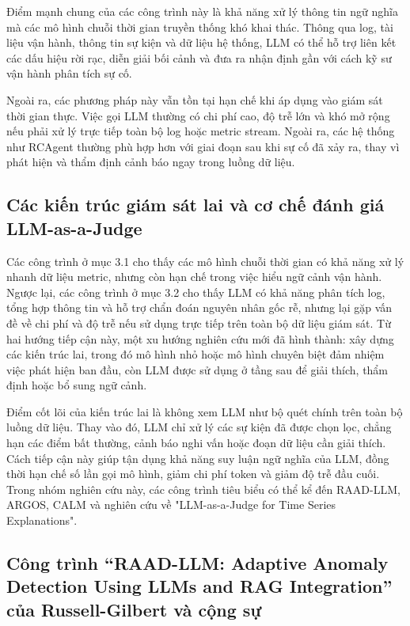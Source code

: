 Điểm mạnh chung của các công trình này là khả năng xử lý thông tin ngữ nghĩa mà các mô hình chuỗi thời gian truyền thống khó khai thác. Thông qua log, tài liệu vận hành, thông tin sự kiện và dữ liệu hệ thống, LLM có thể hỗ trợ liên kết các dấu hiệu rời rạc, diễn giải bối cảnh và đưa ra nhận định gần với cách kỹ sư vận hành phân tích sự cố.

Ngoài ra, các phương pháp này vẫn tồn tại hạn chế khi áp dụng vào giám sát thời gian thực. Việc gọi LLM thường có chi phí cao, độ trễ lớn và khó mở rộng nếu phải xử lý trực tiếp toàn bộ log hoặc metric stream. Ngoài ra, các hệ thống như RCAgent thường phù hợp hơn với giai đoạn sau khi sự cố đã xảy ra, thay vì phát hiện và thẩm định cảnh báo ngay trong luồng dữ liệu.

\subsection{Các kiến trúc giám sát lai và cơ chế đánh giá LLM-as-a-Judge}
Các công trình ở mục 3.1 cho thấy các mô hình chuỗi thời gian có khả năng xử lý nhanh dữ liệu metric, nhưng còn hạn chế trong việc hiểu ngữ cảnh vận hành. Ngược lại, các công trình ở mục 3.2 cho thấy LLM có khả năng phân tích log, tổng hợp thông tin và hỗ trợ chẩn đoán nguyên nhân gốc rễ, nhưng lại gặp vấn đề về chi phí và độ trễ nếu sử dụng trực tiếp trên toàn bộ dữ liệu giám sát. Từ hai hướng tiếp cận này, một xu hướng nghiên cứu mới đã hình thành: xây dựng các kiến trúc lai, trong đó mô hình nhỏ hoặc mô hình chuyên biệt đảm nhiệm việc phát hiện ban đầu, còn LLM được sử dụng ở tầng sau để giải thích, thẩm định hoặc bổ sung ngữ cảnh.

Điểm cốt lõi của kiến trúc lai là không xem LLM như bộ quét chính trên toàn bộ luồng dữ liệu. Thay vào đó, LLM chỉ xử lý các sự kiện đã được chọn lọc, chẳng hạn các điểm bất thường, cảnh báo nghi vấn hoặc đoạn dữ liệu cần giải thích. Cách tiếp cận này giúp tận dụng khả năng suy luận ngữ nghĩa của LLM, đồng thời hạn chế số lần gọi mô hình, giảm chi phí token và giảm độ trễ đầu cuối. Trong nhóm nghiên cứu này, các công trình tiêu biểu có thể kể đến RAAD-LLM, ARGOS, CALM và nghiên cứu về "LLM-as-a-Judge for Time Series Explanations".

\subsection*{Công trình “RAAD-LLM: Adaptive Anomaly Detection Using LLMs and RAG Integration” của Russell-Gilbert và cộng sự}

